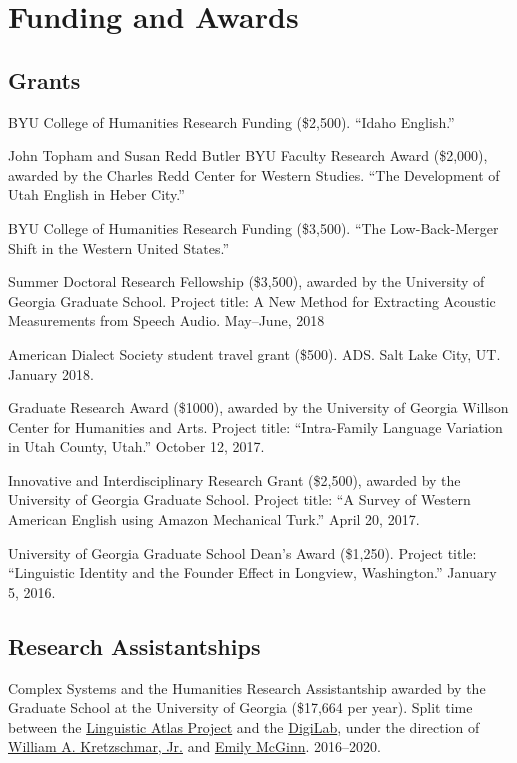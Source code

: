 \documentclass[
]{article}
\begin{document}
\hypertarget{funding-and-awards}{%
\section{Funding and Awards}\label{funding-and-awards}}

\hypertarget{grants}{%
\subsection{Grants}\label{grants}}

BYU College of Humanities Research Funding (\$2,500). ``Idaho English.''

John Topham and Susan Redd Butler BYU Faculty Research Award (\$2,000),
awarded by the Charles Redd Center for Western Studies. ``The
Development of Utah English in Heber City.''

BYU College of Humanities Research Funding (\$3,500). ``The
Low-Back-Merger Shift in the Western United States.''

Summer Doctoral Research Fellowship (\$3,500), awarded by the University
of Georgia Graduate School. Project title: A New Method for Extracting
Acoustic Measurements from Speech Audio. May--June, 2018

American Dialect Society student travel grant (\$500). ADS. Salt Lake
City, UT. January 2018.

Graduate Research Award (\$1000), awarded by the University of Georgia
Willson Center for Humanities and Arts. Project title: ``Intra-Family
Language Variation in Utah County, Utah.'' October 12, 2017.

Innovative and Interdisciplinary Research Grant (\$2,500), awarded by
the University of Georgia Graduate School. Project title: ``A Survey of
Western American English using Amazon Mechanical Turk.'' April 20, 2017.

University of Georgia Graduate School Dean's Award (\$1,250). Project
title: ``Linguistic Identity and the Founder Effect in Longview,
Washington.'' January 5, 2016.

\hypertarget{research-assistantships}{%
\subsection{Research Assistantships}\label{research-assistantships}}

Complex Systems and the Humanities Research Assistantship awarded by the
Graduate School at the University of Georgia (\$17,664 per year). Split
time between the \href{http://www.lap.uga.edu}{Linguistic Atlas Project}
and the \href{http://digi.uga.edu/digilab/}{DigiLab}, under the
direction of
\href{https://www.english.uga.edu/directory/people/william-kretzschmar}{William
A. Kretzschmar, Jr.} and \href{https://emilymcginn.com}{Emily McGinn}.
2016--2020.
\end{document}
